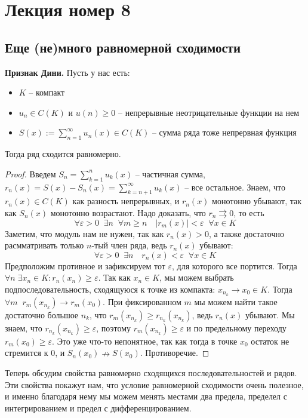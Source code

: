 \section{Лекция номер 8}
\subsection{Еще (не)много равномерной сходимости}

\textbf{Признак Дини.} 
Пусть у нас есть:
\begin{itemize}
    \item $K$ -- компакт
    \item $u_n \in C(K)$ и $u(n) \geqslant 0$ -- непрерывные неотрицательные функции на нем
    \item $S(x) := \sum\limits_{n = 1}^\infty u_n(x) \in C(K)$ -- сумма ряда тоже непрервная функция
\end{itemize}
Тогда ряд сходится равномерно.
\begin{proof}
    Введем $S_n = \sum\limits_{k = 1}^n u_k(x)$ -- частичная сумма, $r_n(x) = S(x) - S_n(x) = \sum\limits_{k = n+1}^\infty u_k(x)$ -- все остальное.
    Знаем, что $r_n(x) \in C(K)$ как разность непрерывных, и $r_n(x)$ монотонно убывают, так как $S_n(x)$ монотонно возрастают.
    Надо доказать, что $r_n \rightrightarrows 0$, то есть \[ \forall \varepsilon > 0  \;\; \exists n \;\; \forall m \geqslant n \quad |r_m(x)| < \varepsilon \;\; \forall x \in K \]
    Заметим, что модуль нам не нужен, так как $r_n(x) > 0$, а также достаточно расмматривать только $n$-тый член ряда, ведь $r_n(x)$ убывают:
    \[ \forall \varepsilon > 0  \;\; \exists n \quad r_n(x) < \varepsilon \;\; \forall x \in K \]
    Предположим противное и зафиксируем тот $\varepsilon$, для которого все портится.
    Тогда $\forall n \; \exists x_n \in K : r_n(x_n) \geqslant \varepsilon$. 
    Так как $x_n \in K$, мы можем выбрать подпоследовательность, сходящуюся к точке из компакта: $x_{n_k} \to x_0 \in K$.
    Тогда $\forall m \;\; r_m(x_{n_k}) \to r_m(x_0)$. 
    При фиксированном $m$ мы можем найти такое достаточно большое $n_k$, что $r_m(x_{n_k}) \geqslant r_{n_k}(x_{n_k})$, ведь $r_n(x)$ убывают.
    Мы знаем, что $r_{n_k}(x_{n_k}) \geqslant \varepsilon$, поэтому $r_m(x_{n_k}) \geqslant \varepsilon$ и по предельному переходу $r_m(x_0) \geqslant \varepsilon$.
    Это уже что-то непонятное, так как тогда в точке $x_0$ остаток не стремится к 0, и $S_n(x_0) \nrightarrow S(x_0)$. Противоречие. 
\end{proof}

 Теперь обсудим свойства равномерно сходящихся последовательностей и рядов.
 Эти свойства покажут нам, что условие равномерной сходимости очень полезное, и именно благодаря нему мы можем менять местами два предела, пределел с интегрированием и предел с дифференцированием.

